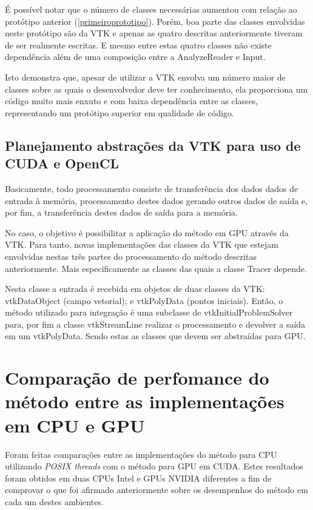   É possível notar que o número de classes necessárias aumentou com relação ao protótipo anterior (\ref{primeiroprototipo}). Porém, boa parte das classes envolvidas neste protótipo são da VTK e apenas as quatro descritas anteriormente tiveram de ser realmente escritas. E mesmo entre estas quatro classes não existe dependência além de uma composição entre a AnalyzeReader e Input.
  
  Isto demonstra que, apesar de utilizar a VTK envolva um número maior de classes sobre as quais o desenvolvedor deve ter conhecimento, ela proporciona um código muito mais enxuto e com baixa dependência entre as classes, representando um protótipo superior em qualidade de código.
  
  \subsection{Planejamento abstrações da VTK para uso de CUDA e OpenCL}
  Basicamente, todo processamento consiste de transferência dos dados dados de entrada à memória, processamento destes dados gerando outros dados de saída e, por fim, a transferência destes dados de saída para a memória.
  
  No caso, o objetivo é possibilitar a aplicação do método em GPU através da VTK. Para tanto, novas implementações das classes da VTK que estejam envolvidas nestas três partes do processamento do método descritas anteriormente. Mais especificamente as classes das quais a classe Tracer depende.
  
  Nesta classe a entrada é recebida em objetos de duas classes da VTK: vtkDataObject (campo vetorial); e vtkPolyData (pontos iniciais). Então, o método utilizado para integração é uma subclasse de vtkInitialProblemSolver para, por fim a classe vtkStreamLine realizar o processamento e devolver a saída em um vtkPolyData. Sendo estas as classes que devem ser abstraídas para GPU.
  
\section{Comparação de perfomance do método entre as implementações em CPU e GPU}
Foram feitas comparações entre as implementações do método para CPU utilizando \textit{POSIX threads} com o método para GPU em CUDA. Estes resultados foram obtidos em duas CPUs Intel e GPUs NVIDIA diferentes a fim de comprovar o que foi afirmado anteriormente sobre os desempenhos do método em cada um destes ambientes.

